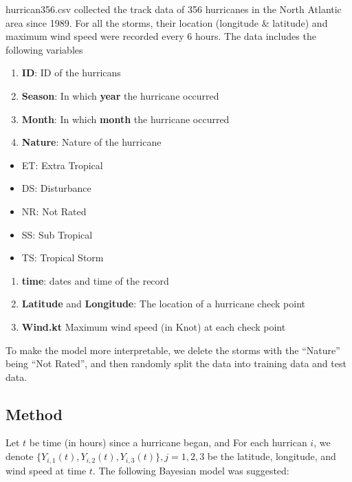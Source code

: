 \documentclass[]{article}
\providecommand{\tightlist}{%
  \setlength{\itemsep}{0pt}\setlength{\parskip}{0pt}}
\begin{document}
hurrican356.csv collected the track data of 356 hurricanes in the North
Atlantic area since 1989. For all the storms, their location (longitude
\& latitude) and maximum wind speed were recorded every 6 hours. The
data includes the following variables

\begin{enumerate}
\def\labelenumi{\arabic{enumi}.}
\tightlist
\item
  \textbf{ID}: ID of the hurricans
\item
  \textbf{Season}: In which \textbf{year} the hurricane occurred
\item
  \textbf{Month}: In which \textbf{month} the hurricane occurred
\item
  \textbf{Nature}: Nature of the hurricane
\end{enumerate}

\begin{itemize}
\tightlist
\item
  ET: Extra Tropical
\item
  DS: Disturbance
\item
  NR: Not Rated
\item
  SS: Sub Tropical
\item
  TS: Tropical Storm
\end{itemize}

\begin{enumerate}
\def\labelenumi{\arabic{enumi}.}
\setcounter{enumi}{4}
\tightlist
\item
  \textbf{time}: dates and time of the record\\
\item
  \textbf{Latitude} and \textbf{Longitude}: The location of a hurricane
  check point
\item
  \textbf{Wind.kt} Maximum wind speed (in Knot) at each check point
\end{enumerate}

To make the model more interpretable, we delete the storms with the
``Nature'' being ``Not Rated'', and then randomly split the data into
training data and test data.

\hypertarget{method}{%
\subsection{Method}\label{method}}

Let \(t\) be time (in hours) since a hurricane began, and For each
hurrican \(i\), we denote
\(\{ Y_{i,1}(t), Y_{i,2}(t), Y_{i,3}(t)\},j=1,2,3\) be the latitude,
longitude, and wind speed at time \(t\). The following Bayesian model
was suggested:
\end{document}
